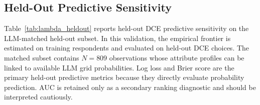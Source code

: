 \documentclass[11pt]{article}
\begin{document}
\subsection{Held-Out Predictive Sensitivity}
\label{app:lambda_heldout_sensitivity}

Table~\ref{tab:lambda_heldout} reports held-out DCE predictive sensitivity on the LLM-matched held-out subset. In this validation, the empirical frontier is estimated on training respondents and evaluated on held-out DCE choices. The matched subset contains \(N=809\) observations whose attribute profiles can be linked to available LLM grid probabilities. Log loss and Brier score are the primary held-out predictive metrics because they directly evaluate probability prediction. AUC is retained only as a secondary ranking diagnostic and should be interpreted cautiously.
\end{document}
